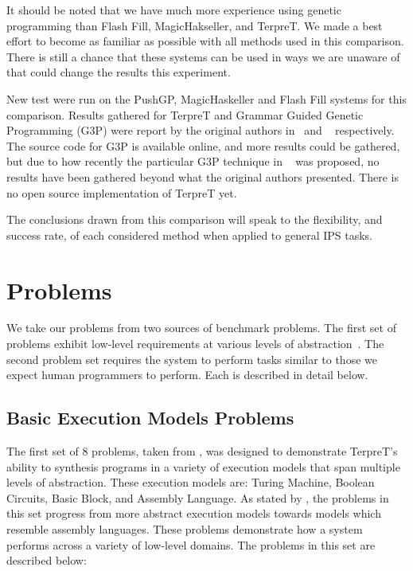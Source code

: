 It should be noted that we have much more experience using genetic programming than Flash Fill, MagicHakseller, and TerpreT. We made a best effort to become as familiar as possible with all methods used in this comparison. There is still a chance that these systems can be used in ways we are unaware of that could change the results this experiment.

New test were run on the PushGP, MagicHaskeller and Flash Fill systems for this comparison. Results gathered for TerpreT and Grammar Guided Genetic Programming (G3P) were report by the original authors in~\cite{Gaunt2016} and ~\cite{Forstenlechner:2017:eurogp} respectively. The source code for G3P is available online, and more results could be gathered, but due to how recently the particular G3P technique in ~\cite{Forstenlechner:2017:eurogp} was proposed, no results have been gathered beyond what the original authors presented. There is no open source implementation of TerpreT yet.

The conclusions drawn from this comparison will speak to the flexibility, and success rate, of each considered method when applied to general IPS tasks.

\section{Problems}

We take our problems from two sources of benchmark problems. The first set of problems exhibit low-level requirements at various levels of abstraction~\cite{Gaunt2016}. The second problem set requires the system to perform tasks similar to those we expect human programmers to perform\cite{Helmuth2015b}. Each is described in detail below.

\subsection{Basic Execution Models Problems}

The first set of 8 problems, taken from \cite{Gaunt2016}, was designed to demonstrate TerpreT's ability to synthesis programs in a variety of execution models that span multiple levels of abstraction. These execution models are: Turing Machine, Boolean Circuits, Basic Block, and Assembly Language. As stated by \cite{Gaunt2016}, the problems in this set progress from more abstract execution models towards models which resemble assembly languages. These problems demonstrate how a system performs across a variety of low-level domains. 
The problems in this set are described below:


